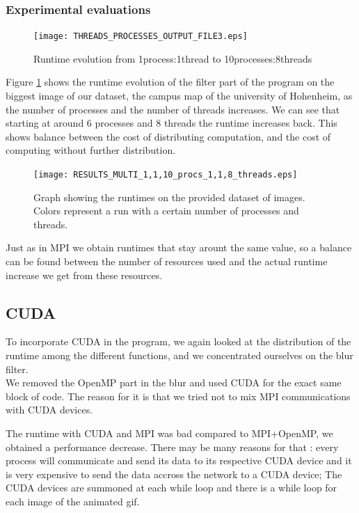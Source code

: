 \documentclass[11pt]{article}
\begin{document}
\subsubsection{Experimental evaluations}
\begin{figure}[H]
	\centering
	\texttt{[image: THREADS\_PROCESSES\_OUTPUT\_FILE3.eps]}
	\caption{Runtime evolution from 1process:1thread to 10processes:8threads}
	\label{fig:OMPeval}
\end{figure}
Figure \ref{fig:OMPeval} shows the runtime evolution of the filter part of the program on the biggest image of our dataset, the campus map of the university of Hohenheim, as the number of processes and the number of threads increases. We can see that starting at around 6 processes and 8 threads the runtime increases back. This shows balance between the cost of distributing computation, and the cost of computing without further distribution.\\
\begin{figure}[H]
	\centering
	\texttt{[image: RESULTS\_MULTI\_1,1,10\_procs\_1,1,8\_threads.eps]}
	\caption{Graph showing the runtimes on the provided dataset of images. Colors represent a run with a certain number of processes and threads.}
	\label{fig:OMPevalGraph}
\end{figure}
Just as in MPI we obtain runtimes that stay arount the same value, so a balance can be found between the number of resources used and the actual runtime increase we get from these resources. \\

\subsection{CUDA}
To incorporate CUDA in the program, we again looked at the distribution of the runtime among the different functions, and we concentrated ourselves on the blur filter. \\
We removed the OpenMP part in the blur and used CUDA for the exact same block of code. The reason for it is that we tried not to mix MPI communications with CUDA devices. 

The runtime with CUDA and MPI was bad compared to MPI+OpenMP, we obtained a performance decrease. There may be many reasons for that : every process will communicate and send its data to its respective CUDA device and it is very expensive to send the data accross the network to a CUDA device; The CUDA devices are summoned at each while loop and there is a while loop for each image of the animated gif. 
\end{document}
